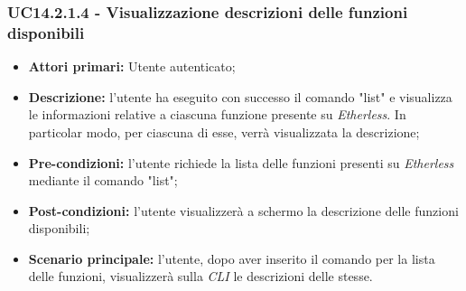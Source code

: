 \subsubsection{UC14.2.1.4 - Visualizzazione descrizioni delle funzioni disponibili}
\begin{itemize}
	\item \textbf{Attori primari:} Utente autenticato;
	\item \textbf{Descrizione:} l'utente ha eseguito con successo il comando "list" e visualizza le informazioni relative a ciascuna funzione presente su \textit{Etherless}. In particolar modo, per ciascuna di esse, verrà visualizzata la descrizione;
	\item \textbf{Pre-condizioni:} l'utente richiede la lista delle funzioni presenti su \textit{Etherless} mediante il comando "list";
	\item \textbf{Post-condizioni:} l'utente visualizzerà a schermo la descrizione delle funzioni disponibili;
	\item \textbf{Scenario principale:} l'utente, dopo aver inserito il comando per la lista delle funzioni, visualizzerà sulla \textit{CLI\glo} le descrizioni delle stesse.
\end{itemize}
